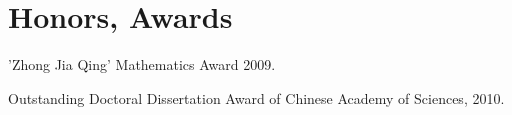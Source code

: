 \documentclass[letterpaper]{article}
\renewenvironment{itemize}{
  \begin{list}{}{
    \setlength{\leftmargin}{1.5em}
  }
}{
  \end{list}
}
\begin{document}
\section*{Honors, Awards}
\begin{itemize}
  \item 'Zhong Jia Qing' Mathematics Award 2009.
  \item Outstanding Doctoral Dissertation Award of 
      Chinese Academy of Sciences, 2010.
\end{itemize}

\bigskip
\end{document}
